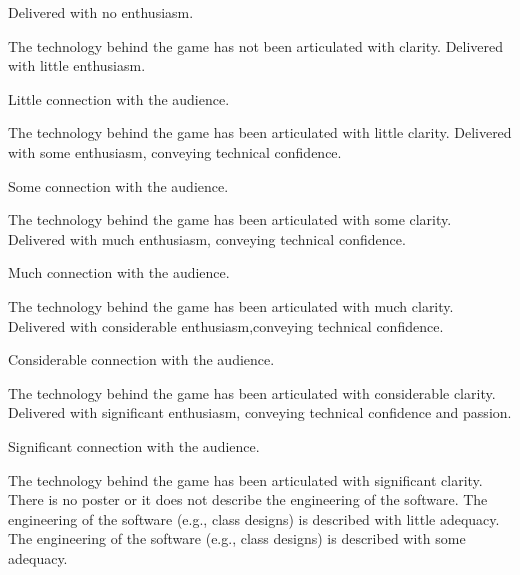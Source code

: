 \documentclass{../fal_assignment}
\begin{document}
\begin{markingrubric}
%
        \grade\fail Delivered with no enthusiasm. 
           \par The technology behind the game has not been articulated with clarity.
        \grade Delivered with little enthusiasm. 
            \par Little connection with the audience.
            \par The technology behind the game has been articulated with little clarity.
        \grade Delivered with some enthusiasm, conveying technical confidence. 
            \par Some connection with the audience.
            \par The technology behind the game has been articulated with some clarity.
        \grade Delivered with much enthusiasm, conveying technical confidence. 
            \par Much connection with the audience.
            \par The technology behind the game has been articulated with much clarity.
        \grade Delivered with considerable enthusiasm,conveying technical confidence. 
            \par Considerable connection with the audience.
            \par The technology behind the game has been articulated with considerable clarity.
        \grade Delivered with significant enthusiasm, conveying technical confidence and passion.
            \par Significant connection with the audience.
            \par The technology behind the game has been articulated with significant clarity.
%
        \grade\fail There is no poster or it does not describe the engineering of the software. 
        \grade The engineering of the software (e.g., class designs) is described with little adequacy.
        \grade The engineering of the software (e.g., class designs) is described with some adequacy.

\end{markingrubric}
\end{document}
